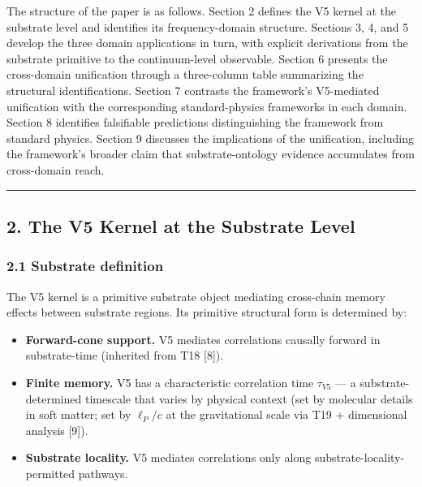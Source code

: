 \documentclass[
  11pt,
  a4paperpaper,
]{article}
\providecommand{\tightlist}{%
  \setlength{\itemsep}{0pt}\setlength{\parskip}{0pt}}
\begin{document}
The structure of the paper is as follows. Section 2 defines the V5
kernel at the substrate level and identifies its frequency-domain
structure. Sections 3, 4, and 5 develop the three domain applications in
turn, with explicit derivations from the substrate primitive to the
continuum-level observable. Section 6 presents the cross-domain
unification through a three-column table summarizing the structural
identifications. Section 7 contrasts the framework's V5-mediated
unification with the corresponding standard-physics frameworks in each
domain. Section 8 identifies falsifiable predictions distinguishing the
framework from standard physics. Section 9 discusses the implications of
the unification, including the framework's broader claim that
substrate-ontology evidence accumulates from cross-domain reach.

\begin{center}\rule{0.5\linewidth}{0.5pt}\end{center}

\subsection{2. The V5 Kernel at the Substrate
Level}\label{the-v5-kernel-at-the-substrate-level}

\subsubsection{2.1 Substrate definition}\label{substrate-definition}

The V5 kernel is a primitive substrate object mediating cross-chain
memory effects between substrate regions. Its primitive structural form
is determined by:

\begin{itemize}
\tightlist
\item
  \textbf{Forward-cone support.} V5 mediates correlations causally
  forward in substrate-time (inherited from T18 {[}8{]}).
\item
  \textbf{Finite memory.} V5 has a characteristic correlation time
  \(\tau_{V5}\) --- a substrate-determined timescale that varies by
  physical context (set by molecular details in soft matter; set by
  \(\ell_P/c\) at the gravitational scale via T19 + dimensional analysis
  {[}9{]}).
\item
  \textbf{Substrate locality.} V5 mediates correlations only along
  substrate-locality-permitted pathways.
\end{itemize}
\end{document}
